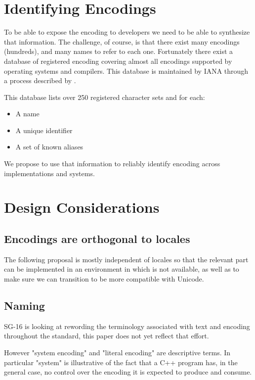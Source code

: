 \documentclass{wg21}
\begin{document}
\section{Identifying Encodings}

To be able to expose the encoding to developers we need to be able to synthesize that information.
The challenge, of course, is that there exist many encodings (hundreds), and many names to refer to each one.
Fortunately there exist a database of registered encoding covering almost all encodings supported by operating systems and compilers.
This database is maintained by IANA through a process described by \cite{rfc2978}.

This database lists over 250 registered character sets and for each:
\begin{itemize}
    \item A name
    \item A unique identifier
    \item A set of known aliases
\end{itemize}

We propose to use that information to reliably identify encoding across implementations and systems.


\section{Design Considerations}

\subsection{Encodings are orthogonal to locales}

The following proposal is mostly independent of locales so that the relevant part can be implemented in an environment in which 
is not available, as well as to make sure we can transition  to be more compatible with Unicode.

\subsection{Naming}
SG-16 is looking at rewording the terminology associated with text and encoding throughout the standard, this paper does not yet reflect that effort.

However "system encoding" and "literal encoding" are descriptive terms. In particular "system" is illustrative of the 
fact that a C++ program has, in the general case, no control over the encoding it is expected to produce and consume.
\end{document}
